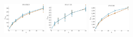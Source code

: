 \documentclass[a4paper]{report}
\newcommand{\wratio}{0.16}
\begin{document}
\includegraphics[width=\wratio\textwidth]{maxcut/PROTEIN/fs_protein}\hfill
\includegraphics[width=\wratio\textwidth]{maxcut/SNAP_GR/fs_snap_gr}\hfill
\includegraphics[width=\wratio\textwidth]{maxcut/SPANISH/fs_spanish}\hfill
\end{document}
